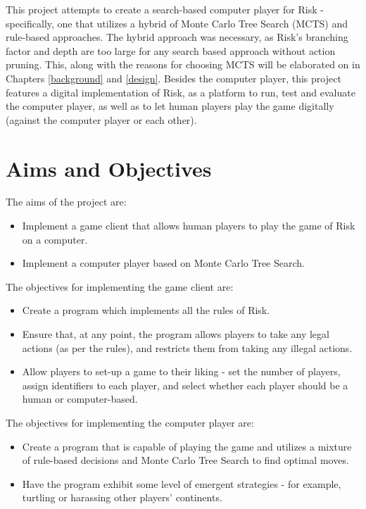 This project attempts to create a search-based computer player for Risk - specifically, one that utilizes a hybrid of Monte Carlo Tree Search (MCTS) \cite{Coulom2007MonteCarlo} and rule-based approaches. The hybrid approach was necessary, as Risk's branching factor and depth are too large for any search based approach without action pruning. This, along with the reasons for choosing MCTS will be elaborated on in Chapters \ref{background} and \ref{design}. Besides the computer player, this project features a digital implementation of Risk, as a platform to run, test and evaluate the computer player, as well as to let human players play the game digitally (against the computer player or each other).

\section{Aims and Objectives}
\label{aimsAndObjectives}

The aims of the project are:
\begin{itemize}
\item Implement a game client that allows human players to play the game of Risk on a computer.
\item Implement a computer player based on Monte Carlo Tree Search.
\end{itemize}
The objectives for implementing the game client are:
\begin{itemize}
\item Create a program which implements all the rules of Risk.
\item Ensure that, at any point, the program allows players to take any legal actions (as per the rules), and restricts them from taking any illegal actions.
\item Allow players to set-up a game to their liking - set the number of players, assign identifiers to each player, and select whether each player should be a human or computer-based.
\end{itemize}
The objectives for implementing the computer player are:
\begin{itemize}
\item Create a program that is capable of playing the game and utilizes a mixture of rule-based decisions and Monte Carlo Tree Search to find optimal moves.
\item Have the program exhibit some level of emergent strategies - for example, turtling or harassing other players' continents.
\end{itemize}

